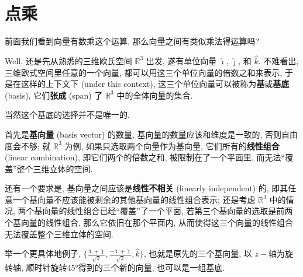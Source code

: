 \section{点乘}\label{025}

前面我们看到向量有数乘这个运算, 那么向量之间有类似乘法得运算吗?

Well, 还是先从熟悉的三维欧氏空间 $\mathbb{R}^3$ 出发, 遂有单位向量
$\hat{\imath}$, $\hat{\jmath}$, 和 $\hat{k}$. 不难看出,
三维欧式空间里任意的一个向量, 都可以用这三个单位向量的倍数之和来表示,
于是在这样的上下文下 (under this context),
这三个单位向量可以被称为\textbf{基}或\textbf{基底} (basis),
它们\textbf{张成} (span) 了 $\mathbb{R}^3$ 中的全体向量的集合.

\begin{newquote}
当然这个基底的选择并不是唯一的.

首先是\textbf{基向量} (basis vector) 的数量,
基向量的数量应该和维度是一致的, 否则自由度会不够; 就 $\mathbb{R}^3$
为例, 如果只选取两个向量作为基向量, 它们所有的\textbf{线性组合} (linear
combination), 即它们两个的倍数之和, 被限制在了一个平面里,
而无法``覆盖''整个三维立体的空间.

还有一个要求是, 基向量之间应该是\textbf{线性不相关} (linearly
independent) 的,
即其任意一个基向量不应该能被剩余的其他基向量的线性组合表示; 还是考虑
$\mathbb{R}^3$ 中的情况, 两个基向量的线性组合已经``覆盖''了一个平面,
若第三个基向量的选取是前两个基向量的线性组合, 那么它依旧在那个平面内,
从而使得这三个向量的线性组合无法覆盖整个三维立体的空间.

举一个更具体地例子,
$\{\frac{\hat{\imath}+\hat{\jmath}}{\sqrt{2}},\frac{-\hat{\imath}+\hat{\jmath}}{\sqrt{2}},\hat{k}\}$,
也就是原先的三个基向量, 以 $z-$轴为旋转轴,
顺时针旋转45°得到的三个新的向量, 也可以是一组基底.
\end{newquote}

